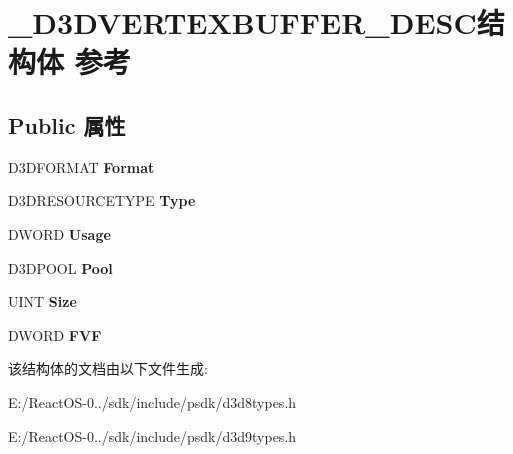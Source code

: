 \hypertarget{struct___d3_d_v_e_r_t_e_x_b_u_f_f_e_r___d_e_s_c}{}\section{\+\_\+\+D3\+D\+V\+E\+R\+T\+E\+X\+B\+U\+F\+F\+E\+R\+\_\+\+D\+E\+S\+C结构体 参考}
\label{struct___d3_d_v_e_r_t_e_x_b_u_f_f_e_r___d_e_s_c}
\subsection*{Public 属性}
\begin{DoxyCompactItemize}
\item 
\mbox{\label{struct___d3_d_v_e_r_t_e_x_b_u_f_f_e_r___d_e_s_c_abfdaf6937973b021d7714558d3dfba10}} 
D3\+D\+F\+O\+R\+M\+AT {\bfseries Format}
\item 
\mbox{\label{struct___d3_d_v_e_r_t_e_x_b_u_f_f_e_r___d_e_s_c_a79e446365703659aff1c4d9e4f19eb7b}} 
D3\+D\+R\+E\+S\+O\+U\+R\+C\+E\+T\+Y\+PE {\bfseries Type}
\item 
\mbox{\label{struct___d3_d_v_e_r_t_e_x_b_u_f_f_e_r___d_e_s_c_ab0f27fa2b3ef6871e616517ab35f69d9}} 
D\+W\+O\+RD {\bfseries Usage}
\item 
\mbox{\label{struct___d3_d_v_e_r_t_e_x_b_u_f_f_e_r___d_e_s_c_a38e88a1c1e1ba09e5a51b1f4cbb81d0e}} 
D3\+D\+P\+O\+OL {\bfseries Pool}
\item 
\mbox{\label{struct___d3_d_v_e_r_t_e_x_b_u_f_f_e_r___d_e_s_c_a52223d609544c565720451259a8f53a1}} 
U\+I\+NT {\bfseries Size}
\item 
\mbox{\label{struct___d3_d_v_e_r_t_e_x_b_u_f_f_e_r___d_e_s_c_a4576539f0cec599a1ba3be19b08177dd}} 
D\+W\+O\+RD {\bfseries F\+VF}
\end{DoxyCompactItemize}


该结构体的文档由以下文件生成\+:\begin{DoxyCompactItemize}
\item 
E\+:/\+React\+O\+S-\/0../sdk/include/psdk/d3d8types.\+h\item 
E\+:/\+React\+O\+S-\/0../sdk/include/psdk/d3d9types.\+h\end{DoxyCompactItemize}
